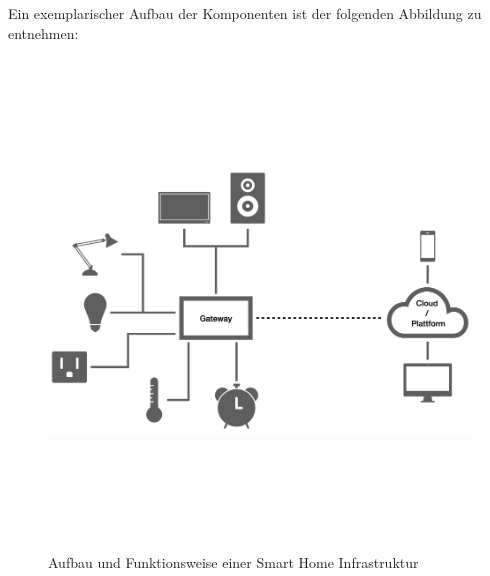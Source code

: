         Ein exemplarischer Aufbau der Komponenten ist der folgenden Abbildung zu entnehmen:
        \begin{figure}[hbt!]
            \centering
            \includegraphics[width=13cm,height=13cm,keepaspectratio]{images/smart_home_connection.png}
            \caption{Aufbau und Funktionsweise einer Smart Home Infrastruktur}
            \label{pic:aufbau_SH}
        \end{figure}

